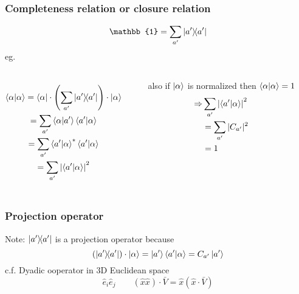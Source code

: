 \begin{frame}
	\frametitle{Completeness relation or closure relation}
	$$
		\mathbb{1} = \sum_{a'} \op{a'}
	$$
	eg.
	\begin{columns}
		\begin{gather*}
			\ip{\alpha} = \bra{\alpha} \cdot \qty(\sum_{a'}\op{a'}) \cdot \ket{\alpha}	\\
			= \sum_{a'} \ip{\alpha}{a'}\ip{a'}{\alpha}\\
			= \sum_{a'} \ip{a'}{\alpha}^*\ip{a'}{\alpha}\\
			= \sum_{a'} \qty|\ip{a'}{\alpha}|^2
		\end{gather*}

		\rule{.1mm}{0.45\textheight}

		also if $\ket{\alpha}$ is normalized then $\ip{\alpha}  = 1$
		\begin{align*}
			\Rightarrow & \sum_{a'} \qty|\ip{a'}{\alpha}|^2 \\
			            & = \sum_{a'} |C_{a'}|^2            \\
			            & = 1
		\end{align*}
	\end{columns}
\end{frame}
\begin{frame}
	\frametitle{Projection operator}

	Note: $\op{a'}$ is a projection operator because
	\[
		\qty(\op{a'})\cdot \ket{\alpha} = \ket{a'} \ip{a'}{\alpha} = C_{a'} \ket{a'}
	\]
	c.f. Dyadic ooperator in 3D Euclidean space
	\[\hat e_i \hat e_j \qquad (\hat x \hat x) \cdot \bar V = \hat x (\hat x \cdot \bar V)\]
\end{frame}
